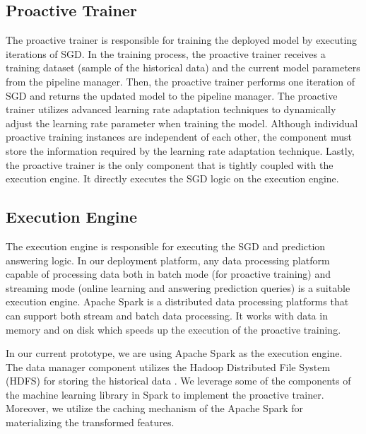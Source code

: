 \subsection{Proactive Trainer} 
The proactive trainer is responsible for training the deployed model by executing iterations of SGD.
In the training process, the proactive trainer receives a training dataset (sample of the historical data) and the current model parameters from the pipeline manager.
Then, the proactive trainer performs one iteration of SGD and returns the updated model to the pipeline manager.
The proactive trainer utilizes advanced learning rate adaptation techniques to dynamically adjust the learning rate parameter when training the model.
Although individual proactive training instances are independent of each other, the component must store the information required by the learning rate adaptation technique.
Lastly, the proactive trainer is the only component that is tightly coupled with the execution engine.
It directly executes the SGD logic on the execution engine.

\subsection{Execution Engine}
The execution engine is responsible for executing the SGD and prediction answering logic.
In our deployment platform, any data processing platform capable of processing data both in batch mode (for proactive training) and streaming mode (online learning and answering prediction queries) is a suitable execution engine.
Apache Spark \cite{zaharia2010spark} is a distributed data processing platforms that can support both stream and batch data processing.
It works with data in memory and on disk which speeds up the execution of the proactive training.

In our current prototype, we are using Apache Spark as the execution engine.
The data manager component utilizes the Hadoop Distributed File System (HDFS) for storing the historical data \cite{shvachko2010hadoop}.
We leverage some of the components of the machine learning library in Spark to implement the proactive trainer.
Moreover, we utilize the caching mechanism of the Apache Spark for materializing the transformed features.
